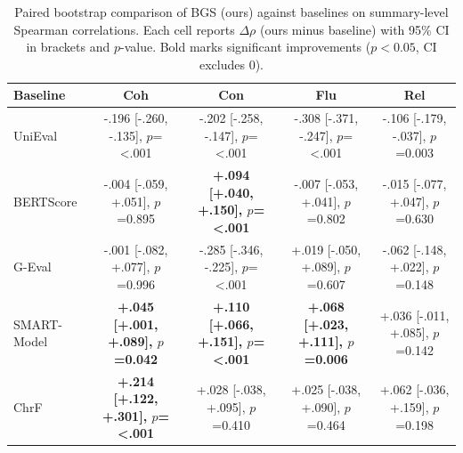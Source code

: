 \begin{table}[t]
\centering
\caption{Paired bootstrap comparison of BGS (ours) against baselines on summary-level Spearman correlations. Each cell reports $\Delta\rho$ (ours minus baseline) with 95\% CI in brackets and $p$-value. Bold marks significant improvements ($p<0.05$, CI excludes 0).}
\label{tab:compare_bgs_summary}
\begin{tabular}{lcccc}
\toprule
Baseline & Coh & Con & Flu & Rel \\
\midrule
UniEval & -.196 {\scriptsize [-.260, -.135], $p$=<.001} & -.202 {\scriptsize [-.258, -.147], $p$=<.001} & -.308 {\scriptsize [-.371, -.247], $p$=<.001} & -.106 {\scriptsize [-.179, -.037], $p$=0.003} \\
BERTScore & -.004 {\scriptsize [-.059, +.051], $p$=0.895} & \textbf{+.094 {\scriptsize [+.040, +.150], $p$=<.001}} & -.007 {\scriptsize [-.053, +.041], $p$=0.802} & -.015 {\scriptsize [-.077, +.047], $p$=0.630} \\
G-Eval & -.001 {\scriptsize [-.082, +.077], $p$=0.996} & -.285 {\scriptsize [-.346, -.225], $p$=<.001} & +.019 {\scriptsize [-.050, +.089], $p$=0.607} & -.062 {\scriptsize [-.148, +.022], $p$=0.148} \\
SMART-Model & \textbf{+.045 {\scriptsize [+.001, +.089], $p$=0.042}} & \textbf{+.110 {\scriptsize [+.066, +.151], $p$=<.001}} & \textbf{+.068 {\scriptsize [+.023, +.111], $p$=0.006}} & +.036 {\scriptsize [-.011, +.085], $p$=0.142} \\
ChrF & \textbf{+.214 {\scriptsize [+.122, +.301], $p$=<.001}} & +.028 {\scriptsize [-.038, +.095], $p$=0.410} & +.025 {\scriptsize [-.038, +.090], $p$=0.464} & +.062 {\scriptsize [-.036, +.159], $p$=0.198} \\
\bottomrule
\end{tabular}
\end{table}

